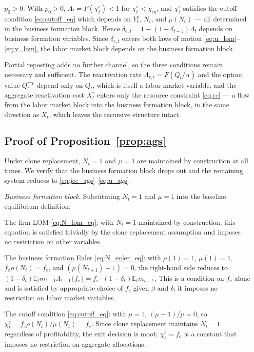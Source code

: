 \documentclass[authoryear, review, 12pt]{elsarticle}
\begin{document}
\emph{$p_0>0$}: With $p_0>0$, 
$\Lambda_t=F(\chi_t^c)<1$ for $\chi_t^c<\chi_m$, 
and $\chi_t^c$ satisfies the cutoff condition 
\eqref{eq:cutoff_eq} which depends on $Y_t^c$, 
$N_t$, and $\mu(N_t)$ --- all determined in the 
business formation block. Hence 
$\delta_{e,t}=1-(1-\delta_{t-1})\Lambda_t$ depends
on business formation variables. Since $\delta_{e,t}$
enters both laws of motion
\eqref{eq:u_lom}--\eqref{eq:v_lom}, the labor
market block depends on the business formation
block.

Partial reposting adds no further channel, so the
three conditions remain necessary and sufficient. The
reactivation rate $\Lambda_{r,t}=F(Q_t/\alpha)$ and
the option value $Q_t^{rep}$ depend only on $Q_t$,
which is itself a labor market variable, and the
aggregate reactivation cost $X_t^r$ enters only the
resource constraint \eqref{eq:rc} --- a flow from the
labor market block into the business formation block,
in the same direction as $X_t$, which leaves the
recursive structure intact.

\subsection*{Proof of Proposition~\ref{prop:ags}}

Under clone replacement, $N_t=1$ and $\mu=1$ are 
maintained by construction at all times. We verify 
that the business formation block drops out and 
the remaining system reduces to 
\eqref{eq:jcc_ags}--\eqref{eq:u_ags}.

\emph{Business formation block.} Substituting 
$N_t=1$ and $\mu=1$ into the baseline equilibrium 
definition:

The firm LOM \eqref{eq:N_lom_eq}: with $N_t=1$ 
maintained by construction, this equation is 
satisfied trivially by the clone replacement 
assumption and imposes no restriction on other 
variables.

The business formation Euler \eqref{eq:N_euler_eq}: 
with $\rho(1)=1$, $\mu(1)=1$, $f_e\rho(N_t)=f_e$, 
and $(\mu(N_{t+1})-1)=0$, the right-hand side 
reduces to $(1-\delta_t)\mathbb{E}_t m_{t+1}\Lambda_{t+1}
\{f_e\}=f_e\cdot(1-\delta_t)\mathbb{E}_t m_{t+1}$. 
This is a condition on $f_e$ alone and is satisfied 
by appropriate choice of $f_e$ given $\beta$ and 
$\bar{\delta}$; it imposes no restriction on labor 
market variables.

The cutoff condition \eqref{eq:cutoff_eq}: with 
$\mu=1$, $(\mu-1)/\mu=0$, so 
$\chi_t^c = f_e\rho(N_t)/\mu(N_t) = f_e$. Since 
clone replacement maintains $N_t=1$ regardless of 
profitability, the exit decision is moot; 
$\chi_t^c=f_e$ is a constant that imposes no 
restriction on aggregate allocations.
\end{document}
